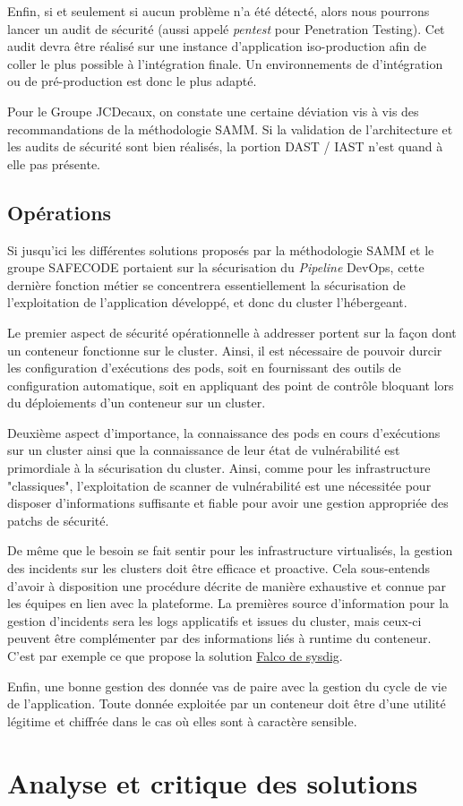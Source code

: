Enfin, si et seulement si aucun problème n'a été détecté, alors nous pourrons lancer un audit de sécurité (aussi appelé 
\emph{pentest} pour Penetration Testing). Cet audit devra être réalisé sur une instance d'application iso-production afin
de coller le plus possible à l'intégration finale. Un environnements de d'intégration ou de pré-production est donc le 
plus adapté.

Pour le Groupe JCDecaux, on constate une certaine déviation vis à vis des recommandations de la méthodologie \ac{SAMM}.
Si la validation de l'architecture et les audits de sécurité sont bien réalisés, la portion \ac{DAST} / {IAST} n'est 
quand à elle pas présente.

\subsection{Opérations}
Si jusqu'ici les différentes solutions proposés par la méthodologie \ac{SAMM} et le groupe \ac{SAFECODE} portaient sur
la sécurisation du \emph{Pipeline} DevOps, cette dernière fonction métier se concentrera essentiellement la sécurisation
de l'exploitation de l'application développé, et donc du cluster l'hébergeant.

Le premier aspect de sécurité opérationnelle à addresser portent sur la façon dont un conteneur fonctionne sur le cluster.
Ainsi, il est nécessaire de pouvoir durcir les configuration d'exécutions des pods, soit en fournissant des outils de 
configuration automatique, soit en  appliquant des point de contrôle bloquant lors du déploiements d'un conteneur sur un 
cluster.

Deuxième aspect d'importance, la connaissance des pods en cours d'exécutions sur un cluster ainsi que la connaissance de
leur état de vulnérabilité est primordiale à la sécurisation du cluster. Ainsi, comme pour les infrastructure "classiques",
l'exploitation de scanner de vulnérabilité est une nécessitée pour disposer d'informations suffisante et fiable pour
avoir une gestion appropriée des patchs de sécurité.

De même que le besoin se fait sentir pour les infrastructure virtualisés, la gestion des incidents sur les clusters doit 
être efficace et proactive. Cela sous-entends d'avoir à disposition une procédure décrite de manière exhaustive et connue
par les équipes en lien avec la plateforme.
\newline La premières source d'information pour la gestion d'incidents sera les logs applicatifs et issues du cluster, 
mais ceux-ci peuvent être complémenter par des informations liés à runtime du conteneur. C'est par exemple ce que propose
la solution \href{https://sysdig.com/opensource/falco/}{Falco de sysdig}.

Enfin, une bonne gestion des donnée vas de paire avec la gestion du cycle de vie de l'application.
\newline Toute donnée exploitée par un conteneur doit être d'une utilité légitime et chiffrée dans le cas où elles sont
à caractère sensible.
 

\newpage

\section{Analyse et critique des solutions}